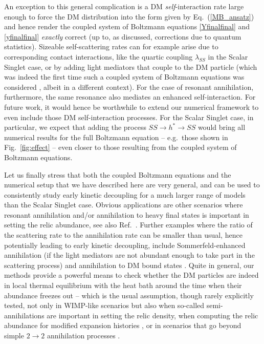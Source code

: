 \documentclass[twocolumn,showpacs,amsmath,amssymb,superscriptaddress,nofootinbib]{revtex4-1}
\begin{document}
An exception to this general complication is a DM {\it self}-interaction rate large enough to 
force the DM distribution into the form given by 
Eq.~(\ref{MB_ansatz}) \cite{Feng:2009hw,Buckley:2009in,Feng:2010zp,vandenAarssen:2012ag} and hence
render the coupled system of Boltzmann equations \eqref{Yfinalfinal} and 
\eqref{yfinalfinal} {\it exactly} correct (up to, as discussed, corrections due to quantum statistics).
Sizeable self-scattering rates can for example arise due to corresponding contact 
interactions, like the quartic coupling $\lambda_{SS}$ in the Scalar Singlet case, or by adding light
mediators that couple to the DM particle (which was indeed the first time such a coupled system
of Boltzmann equations was considered \cite{vandenAarssen:2012ag}, albeit in a different context).  
For the case of resonant annihilation, furthermore, the same resonance also mediates an enhanced 
self-interaction. For future work, it would hence be worthwhile to extend our numerical framework 
to even include those DM self-interaction processes. For the Scalar Singlet case, in particular, we 
expect that adding the process $SS\to h^*\to SS$ would bring all numerical 
results for the full Boltzmann equation -- e.g.~those shown in Fig.~\ref{fig:effect} -- even closer to those 
resulting from the coupled system of Boltzmann equations.

Let us finally stress that both the coupled Boltzmann equations and the numerical setup that
we have described here are very general, and can be used to consistently study early kinetic 
decoupling for a much larger range of models than the Scalar Singlet case. Obvious 
applications are other scenarios where resonant annihilation and/or annihilation to heavy 
final states is important in setting the relic abundance, see also Ref.~\cite{Duch:2017nbe}.
Further examples where the ratio of the scattering rate to the annihilation rate can be smaller than
usual, hence potentially leading to early kinetic decoupling, include Sommerfeld-enhanced 
annihilation \cite{Dent:2009bv,Zavala:2009mi,Feng:2010zp,vandenAarssen:2012ag} (if the light mediators are 
not abundant enough to take part in the 
scattering process) and annihilation to DM bound states \cite{Feng:2009mn,vonHarling:2014kha}. 
Quite in general, our methods provide a powerful means to check whether the DM particles 
are indeed in local thermal equilibrium with the heat bath around the time when their 
abundance freezes out -- which is the usual assumption, though rarely explicitly tested,  
not only in WIMP-like scenarios but also when so-called semi-annihilations \cite{DEramo:2010keq} 
are important in setting the relic density, when computing the relic abundance for 
modified expansion histories \cite{DEramo:2017gpl, Redmond:2017tja}, or in scenarios that go 
beyond simple $2\to2$ annihilation processes \cite{Hochberg:2014dra,Hochberg:2014kqa,Kuflik:2015isi}.
\end{document}
